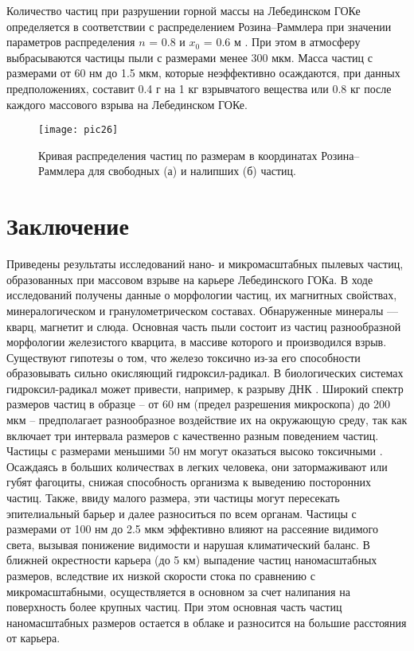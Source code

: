 Количество частиц при разрушении горной массы на Лебединском ГОКе определяется в соответствии с распределением Розина–Раммлера при значении параметров распределения $n$ = 0.8 и $x_{0}$ = 0.6 м \cite{bib11}. При этом в атмосферу выбрасываются частицы пыли с размерами менее 300 мкм. Масса частиц с размерами от 60 нм до 1.5 мкм, которые неэффективно осаждаются, при данных предположениях, составит 0.4 г на 1 кг взрывчатого вещества или 0.8 кг после каждого массового взрыва на Лебединском ГОКе.

\begin{figure} [H] 
  \center
  \texttt{[image: pic26]}
  \caption{Кривая распределения частиц по размерам в координатах Розина–Раммлера для свободных (а) и налипших (б) частиц.} 
  \label{img:2rozinrammler}  
\end{figure}

\section{Заключение} \label{sect2_5}

Приведены результаты исследований нано- и микромасштабных пылевых частиц, образованных при массовом взрыве на карьере Лебединского ГОКа. В ходе исследований получены данные о морфологии частиц, их магнитных свойствах, минералогическом и гранулометрическом составах. Обнаруженные минералы — кварц, магнетит и слюда. Основная часть пыли состоит из частиц разнообразной морфологии железистого кварцита, в массиве которого и производился взрыв. Существуют гипотезы о том, что железо токсично из-за его способности образовывать сильно окисляющий гидроксил-радикал. В биологических системах гидроксил-радикал может привести, например, к разрыву ДНК \cite{bib17}. Широкий спектр размеров частиц в образце – от 60 нм (предел разрешения микроскопа) до 200 мкм – предполагает разнообразное воздействие их на окружающую среду, так как включает три интервала размеров с качественно разным поведением частиц. Частицы с размерами меньшими 50 нм могут оказаться высоко токсичными \cite{bib06}. Осаждаясь в больших количествах в легких человека, они затормаживают или губят фагоциты, снижая способность организма к выведению посторонних частиц. Также, ввиду малого размера, эти частицы могут пересекать эпителиальный барьер и далее разноситься по всем органам. Частицы с размерами от 100 нм до 2.5 мкм эффективно влияют на рассеяние видимого света, вызывая понижение видимости и нарушая климатический баланс. В ближней окрестности карьера (до 5 км) выпадение частиц наномасштабных размеров, вследствие их низкой скорости стока по сравнению с микромасштабными, осуществляется в основном за счет налипания на поверхность более крупных частиц. При этом основная часть частиц наномасштабных размеров остается в облаке и разносится на большие расстояния от карьера.



\clearpage